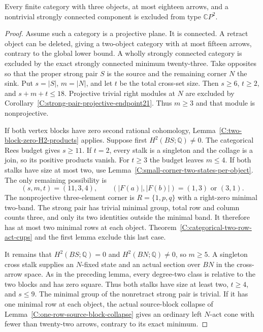 \begin{theorem}\label{C:eighteen-three-strong-component}
Every finite category with three objects, at most eighteen
arrows, and a nontrivial strongly connected component is
excluded from type $\mathbb CP^2$.
\end{theorem}
\begin{proof}
Assume such a category is a projective plane. It is connected.
A retract object can be deleted, giving a two-object category
with at most fifteen arrows, contrary to the global lower
bound. A wholly strongly connected category is excluded by
the exact strongly connected minimum twenty-three.
Take opposites so that the proper strong pair $S$ is the
source and the remaining corner $N$ the sink. Put
$s=|S|$, $m=|N|$, and let $t$ be the total cross-set size.
Then $s\geq6$, $t\geq2$, and $s+m+t\leq18$.
Projective trivial right modules at $N$ are excluded by
Corollary~\ref{C:strong-pair-projective-endpoint21}.
Thus $m\geq3$ and that module is nonprojective.

If both vertex blocks have zero second rational cohomology,
Lemma~\ref{C:two-block-zero-H2-products} applies.
Suppose first $H^2(BS;\mathbb Q)\ne0$. The categorical Rees
budget gives $s\geq11$. If $t=2$, every stalk is a singleton
and the collage is a join, so its positive products vanish.
For $t\geq3$ the budget leaves $m\leq4$. If both stalks
have size at most two, use
Lemma~\ref{C:small-corner-two-states-per-object}.
The only remaining possibility is
\[
 (s,m,t)=(11,3,4),\qquad
 (|F(a)|,|F(b)|)=(1,3)\text{ or }(3,1).
\]
The nonprojective three-element corner is $R=\{1,p,q\}$
with a right-zero minimal two-band. The strong pair has
trivial minimal group, total row and column counts three,
and only its two identities outside the minimal band.
It therefore has at most two minimal rows at each object.
Theorem~\ref{C:categorical-two-row-act-cups} and the first
lemma exclude this last case.

It remains that $H^2(BS;\mathbb Q)=0$ and
$H^2(BN;\mathbb Q)\ne0$, so $m\geq5$.
A singleton cross stalk supplies an $N$-fixed state and
an actual section over $BN$ in the cross-arrow space.
As in the preceding lemma, every degree-two class is
relative to the two blocks and has zero square. Thus both
stalks have size at least two, $t\geq4$, and $s\leq9$.
The minimal group of the nonretract strong pair is trivial.
If it has one minimal row at each object, the actual
source-block collapse of
Lemma~\ref{C:one-row-source-block-collapse} gives an ordinary
left $N$-act cone with fewer than twenty-two arrows,
contrary to its exact minimum.


\end{proof}
